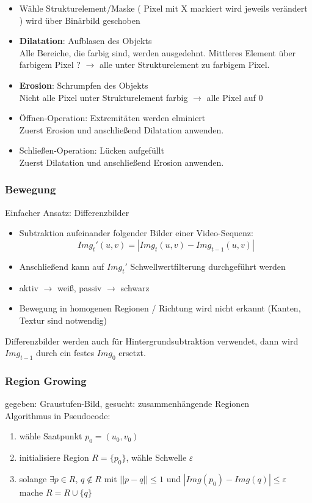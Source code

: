 \begin{itemize}
\item Wähle Strukturelement/Maske ( Pixel mit X markiert wird jeweils verändert ) wird über Binärbild geschoben
\item \textbf{Dilatation}: Aufblasen des Objekts \\ 
Alle Bereiche, die farbig sind, werden ausgedehnt. Mittleres Element über farbigem Pixel ? $\to$ alle unter Strukturelement zu farbigem Pixel.
\item \textbf{Erosion}: Schrumpfen des Objekts \\
Nicht alle Pixel unter Strukturelement farbig $\to$ alle Pixel auf 0
\item Öffnen-Operation: Extremitäten werden elminiert \\ 
Zuerst Erosion und anschließend Dilatation anwenden.
\item Schließen-Operation: Lücken aufgefüllt \\
Zuerst Dilatation und anschließend Erosion anwenden.

\end{itemize}


\subsubsection{Bewegung}

Einfacher Ansatz: Differenzbilder
\begin{itemize}
\item Subtraktion aufeinander folgender Bilder einer Video-Sequenz: $$Img_t'(u,v) = |Img_t(u,v) - Img_{t-1}(u,v)|$$
\item Anschließend kann auf $Img_t'$ Schwellwertfilterung durchgeführt werden
\item aktiv $\to$ weiß, passiv $\to$ schwarz
\item Bewegung in homogenen Regionen / Richtung wird nicht erkannt (Kanten, Textur sind notwendig)
\end{itemize}
Differenzbilder werden auch für Hintergrundsubtraktion verwendet, dann wird $Img_{t-1}$ durch ein festes $Img_0$ ersetzt.

\subsubsection{Region Growing}

gegeben: Graustufen-Bild, gesucht: zusammenhängende Regionen \\ Algorithmus in Pseudocode:
\begin{enumerate}
\item wähle Saatpunkt $p_0 = (u_0,v_0)$
\item initialisiere Region $R = \{ p_0 \}$, wähle Schwelle $\varepsilon$
\item solange $\exists p \in R$, $q \not\in R$ mit $||p-q|| \leq 1$ und $|Img(p_0) - Img(q)| \leq \varepsilon$ mache $R = R \cup \{ q \}$
\end{enumerate}

